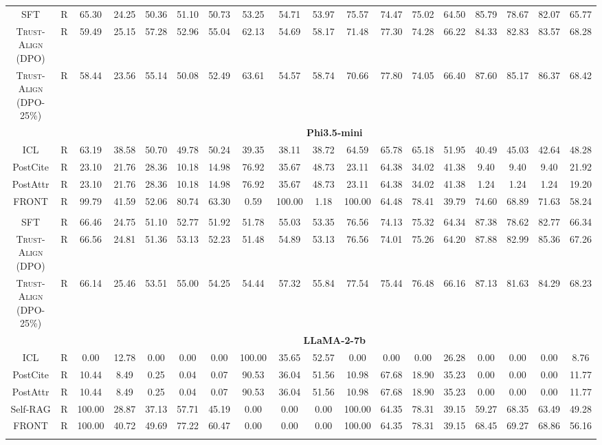 \documentclass{article} %
\newcommand{\method}[0]{\textsc{Trust-Align}}
\begin{document}
\begin{table}[htb!]
{\begin{tabular}{ccc*{15}c}
SFT & R & 65.30 & 24.25 & 50.36 & 51.10 & 50.73 & 53.25 & 54.71 & 53.97 & 75.57 & 74.47 & 75.02 & 64.50 & 85.79 & 78.67 & 82.07 & 65.77 \\
\method{} (DPO) & R & 59.49 & 25.15 & 57.28 & 52.96 & 55.04 & 62.13 & 54.69 & 58.17 & 71.48 & 77.30 & 74.28 & 66.22 & 84.33 & 82.83 & 83.57 & 68.28 \\
\method{} (DPO-25\%) & R & 58.44 & 23.56 & 55.14 & 50.08 & 52.49 & 63.61 & 54.57 & 58.74 & 70.66 & 77.80 & 74.05 & 66.40 & 87.60 & 85.17 & 86.37 & 68.42 \\

& & \multicolumn{16}{c}{\cellcolor[gray]{0.9}\textbf{Phi3.5-mini}} \\
ICL & R & 63.19 & 38.58 & 50.70 & 49.78 & 50.24 & 39.35 & 38.11 & 38.72 & 64.59 & 65.78 & 65.18 & 51.95 & 40.49 & 45.03 & 42.64 & 48.28 \\
PostCite & R & 23.10 & 21.76 & 28.36 & 10.18 & 14.98 & 76.92 & 35.67 & 48.73 & 23.11 & 64.38 & 34.02 & 41.38 & 9.40 & 9.40 & 9.40 & 21.92 \\
PostAttr & R & 23.10 & 21.76 & 28.36 & 10.18 & 14.98 & 76.92 & 35.67 & 48.73 & 23.11 & 64.38 & 34.02 & 41.38 & 1.24 & 1.24 & 1.24 & 19.20 \\
FRONT & R & 99.79 & 41.59 & 52.06 & 80.74 & 63.30 & 0.59 & 100.00 & 1.18 & 100.00 & 64.48 & 78.41 & 39.79 & 74.60 & 68.89 & 71.63 & 58.24 \\\\

SFT & R & 66.46 & 24.75 & 51.10 & 52.77 & 51.92 & 51.78 & 55.03 & 53.35 & 76.56 & 74.13 & 75.32 & 64.34 & 87.38 & 78.62 & 82.77 & 66.34 \\
\method{} (DPO) & R & 66.56 & 24.81 & 51.36 & 53.13 & 52.23 & 51.48 & 54.89 & 53.13 & 76.56 & 74.01 & 75.26 & 64.20 & 87.88 & 82.99 & 85.36 & 67.26 \\
\method{} (DPO-25\%) & R & 66.14 & 25.46 & 53.51 & 55.00 & 54.25 & 54.44 & 57.32 & 55.84 & 77.54 & 75.44 & 76.48 & 66.16 & 87.13 & 81.63 & 84.29 & 68.23 \\

& & \multicolumn{16}{c}{\cellcolor[gray]{0.9}\textbf{LLaMA-2-7b}} \\
ICL & R & 0.00 & 12.78 & 0.00 & 0.00 & 0.00 & 100.00 & 35.65 & 52.57 & 0.00 & 0.00 & 0.00 & 26.28 & 0.00 & 0.00 & 0.00 & 8.76 \\
PostCite & R & 10.44 & 8.49 & 0.25 & 0.04 & 0.07 & 90.53 & 36.04 & 51.56 & 10.98 & 67.68 & 18.90 & 35.23 & 0.00 & 0.00 & 0.00 & 11.77 \\
PostAttr & R & 10.44 & 8.49 & 0.25 & 0.04 & 0.07 & 90.53 & 36.04 & 51.56 & 10.98 & 67.68 & 18.90 & 35.23 & 0.00 & 0.00 & 0.00 & 11.77 \\
Self-RAG & R & 100.00 & 28.87 & 37.13 & 57.71 & 45.19 & 0.00 & 0.00 & 0.00 & 100.00 & 64.35 & 78.31 & 39.15 & 59.27 & 68.35 & 63.49 & 49.28 \\
FRONT & R  & 100.00 & 40.72 & 49.69 & 77.22 & 60.47 & 0.00 & 0.00 & 0.00 & 100.00 & 64.35 & 78.31 & 39.15 & 68.45 & 69.27 & 68.86 & 56.16 \\\\


\end{tabular}}
\end{table}
\end{document}
